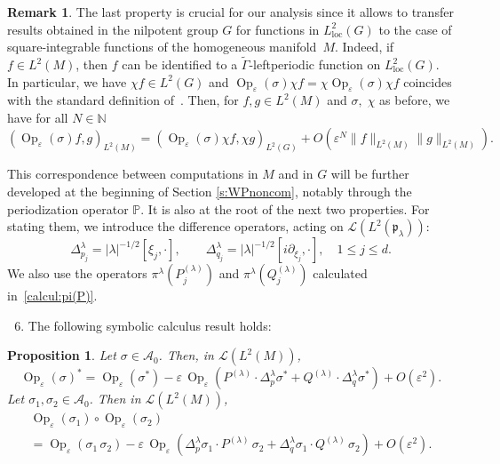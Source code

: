 \documentclass[JEP,XML,SOM,Unicode,published]{cedram}
\let\mathcal\mathscr
\newcommand{\loc}{\mathrm{loc}}
\DeclareMathOperator{\Op}{Op}
\theoremstyle{plain}
\newtheorem{proposition}[theorem]{Proposition}
\theoremstyle{definition}
\newtheorem{remark}[theorem]{Remark}
\let\eps\varepsilon
\def\N{{\mathbb N}}
\def\bbP{{\mathbb P}}
\begin{document}
\begin{remark}\label{correspGM}
The last property is crucial for our analysis since it allows to transfer results obtained in the nilpotent group $G$ for functions in $L^2_\loc (G)$ to the case of square-integrable functions of the homogeneous manifold~$M$. Indeed, if $f\in L^2(M)$, then $f$ can be identified to a $\widetilde{\Gamma}$-leftperiodic function on $L^2_{\loc}(G)$. In particular, we have $\chi f\in L^2(G)$ and $ \Op_\eps(\sigma) \chi f= \chi \Op_\eps(\sigma) \chi f $ coincides with the standard definition of~\cite{FF1,FF}. Then, for $f,g\in L^2(M)$ and $\sigma,\;\chi$ as before, we have for all $N\in\N$
\begin{equation*}%
\left(\Op_\eps(\sigma) f,g\right)_{L^2(M)} = \left(\Op_\eps(\sigma)\chi f,\chi g\right)_{L^2(G)} +O(\eps^N \| f\|_{L^2(M)}\|g\|_{L^2(M)}).
\end{equation*}
\end{remark}

This correspondence between computations in $M$ and in $G$ will be further developed at the beginning of Section \ref{s:WPnoncom}, notably through the periodization operator $\bbP$. It is also at the root of the next two properties. For stating them, we introduce the difference operators, acting on ${\mathcal L}(L^2(\mathfrak p_\lambda))$:
\[
\Delta_{p_j}^{\lambda}= |\lambda|^{-1/2}[\xi_j, \cdot ],
\qquad
\Delta_{q_j}^{\lambda} = |\lambda|^{-1/2}[i\partial_{\xi_j}, \cdot],
\quad 1\leq j\leq d.
\]
We also use the operators $\pi^\lambda(P^{(\lambda)}_j)$ and $\pi^\lambda(Q^{(\lambda)}_j)$ calculated in~\eqref{calcul:pi(P)}.

\begin{enumerate}\setcounter{enumi}{5}
\item\label{fact:6} The following symbolic calculus result holds:
\end{enumerate}

\begin{proposition}\label{prop:symbcal}
Let $\sigma\in {\mathcal A}_0$. Then, in ${\mathcal L}(L^2(M))$,
\begin{equation}\label{adjoint}
\Op_\eps(\sigma)^*= \Op_\eps (\sigma^*) -{\eps} \,\Op_\eps(P^{(\lambda)}\cdot \Delta^\lambda_p \sigma^*+Q^{(\lambda)}\cdot \Delta^\lambda_q \sigma^*)+O(\eps^2).
\end{equation}
Let $\sigma_1,\sigma_2 \in {\mathcal A}_0$. Then in ${\mathcal L}(L^2(M))$,
\begin{multline}\label{composition}
\Op_\eps(\sigma_1)\circ \Op_\eps(\sigma_2)\\
= \Op_\eps(\sigma_1\,\sigma_2) -\eps\, \Op_\eps\left(\Delta_p^\lambda \sigma_1 \cdot P^{(\lambda)}\,\sigma_2+\Delta^\lambda_q \sigma_1 \cdot Q^{(\lambda)}\, \sigma_2\right)+O(\eps^2).
\end{multline}
\end{proposition}
\end{document}
